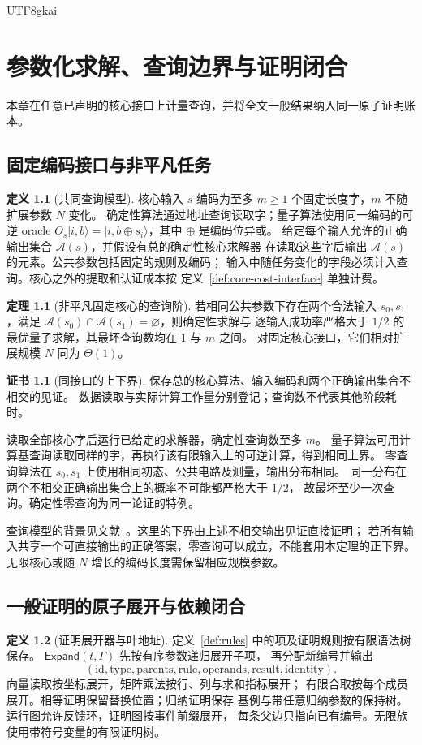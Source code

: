 \documentclass[12pt]{report}
\makeatletter
\theoremstyle{definition}
\newtheorem{definition}{定义}[chapter]
\newtheorem{theorem}{定理}[chapter]
\newtheorem{Certificate}{证书}[chapter]
\renewenvironment{proof}[1][\proofname]{\par
  \pushQED{\qed}\normalfont
  \topsep6\p@\@plus6\p@\relax
  \trivlist
  \item[\hskip\labelsep\normalfont #1\@addpunct{.}]\ignorespaces
}{
  \popQED\endtrivlist\@endpefalse
}
\makeatother
\begin{document}
\begin{CJK*}{UTF8}{gkai}
\chapter{参数化求解、查询边界与证明闭合}
\label{sec:quantum}
本章在任意已声明的核心接口上计量查询，并将全文一般结果纳入同一原子证明账本。
\section{固定编码接口与非平凡任务}
\begin{definition}[共同查询模型]
核心输入 \(s\) 编码为至多 \(m\ge1\) 个固定长度字，\(m\) 不随扩展参数 \(N\) 变化。
确定性算法通过地址查询读取字；量子算法使用同一编码的可逆 oracle
\(O_s|i,b\rangle=|i,b\oplus s_i\rangle\)，其中 \(\oplus\) 是编码位异或。
给定每个输入允许的正确输出集合 \(\mathcal A(s)\)，并假设有总的确定性核心求解器
在读取这些字后输出 \(\mathcal A(s)\) 的元素。公共参数包括固定的规则及编码；
输入中随任务变化的字段必须计入查询。核心之外的提取和认证成本按
定义~\ref{def:core-cost-interface} 单独计费。
\end{definition}
\begin{theorem}[非平凡固定核心的查询阶]
\label{thm:quantum}
若相同公共参数下存在两个合法输入 \(s_0,s_1\)，满足
\(\mathcal A(s_0)\cap\mathcal A(s_1)=\varnothing\)，则确定性求解与
逐输入成功率严格大于 \(1/2\) 的最优量子求解，其最坏查询数均在 \(1\) 与 \(m\) 之间。
对固定核心接口，它们相对扩展规模 \(N\) 同为 \(\Theta(1)\)。
\end{theorem}
\begin{Certificate}[同接口的上下界]
保存总的核心算法、输入编码和两个正确输出集合不相交的见证。
数据读取与实际计算工作量分别登记；查询数不代表其他阶段耗时。
\end{Certificate}
\begin{proof}
读取全部核心字后运行已给定的求解器，确定性查询数至多 \(m\)。
量子算法可用计算基查询读取同样的字，再执行该有限输入上的可逆计算，得到相同上界。
零查询算法在 \(s_0,s_1\) 上使用相同初态、公共电路及测量，输出分布相同。
同一分布在两个不相交正确输出集合上的概率不可能都严格大于 \(1/2\)，
故最坏至少一次查询。确定性零查询为同一论证的特例。
\end{proof}
查询模型的背景见文献~\cite{beals}。这里的下界由上述不相交输出见证直接证明；
若所有输入共享一个可直接输出的正确答案，零查询可以成立，不能套用本定理的正下界。
无限核心或随 \(N\) 增长的编码长度需保留相应规模参数。


\section{一般证明的原子展开与依赖闭合}
\label{sec:atomic-ledger}
\begin{definition}[证明展开器与叶地址]
定义~\ref{def:rules} 中的项及证明规则按有限语法树保存。
\(\mathsf{Expand}(t,\Gamma)\) 先按有序参数递归展开子项，
再分配新编号并输出
\[
(\mathrm{id},\mathrm{type},\mathrm{parents},\mathrm{rule},
 \mathrm{operands},\mathrm{result},\mathrm{identity}) .
\]
向量读取按坐标展开，矩阵乘法按行、列与求和指标展开；
有限合取按每个成员展开。相等证明保留替换位置；归纳证明保存
基例与带任意归纳参数的保持树。运行图允许反馈环，证明图按事件前缀展开，
每条父边只指向已有编号。无限族使用带符号变量的有限证明树。


\end{definition}
\end{CJK*}
\end{document}
